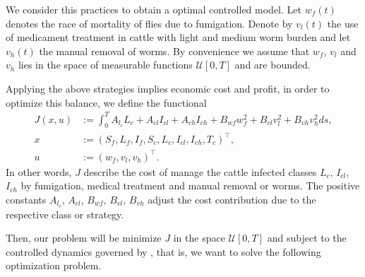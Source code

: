\documentclass[preprint, 12pt]{elsarticle}
\begin{document}
        We consider this practices to obtain a optimal controlled model.
    Let $w_f(t)$ denotes the race of mortality of flies due to fumigation.
    Denote by $v_l(t)$ the use of medicament treatment in cattle with light and
    medium worm burden and let $v_h(t)$ the manual removal of worms. By
    convenience we  assume that $w_f$, $v_l$ and $v_h$ lies in the space of
    measurable functions $\mathcal{U}[0, T]$ and are bounded.

        Applying the above strategies implies economic cost and profit, in
    order to optimize this balance, we define the functional
    \begin{equation}\label{eqn:cost_functional}
        \begin{aligned}
            J(x, u) &:=
                \int_0 ^T
                    A_{l_c} L_c
                    + A_{cl} I_{cl}
                    + A_{ch} I_{ch}
                    + B_{wf}  w_f ^ 2
                    + B_{vl}  v_l ^ 2
                    + B_{vh}  v_h ^ 2
                ds,
            \\
            x &:= (S_f, L_f, I_f, S_c, L_c, I_{cl}, I_{ch}, T_c)^{\top},
            \\
            u &:= (w_f, v_l, v_h)^{\top} .
        \end{aligned}
    \end{equation}
%
    In other words, $J$ describe the cost of manage the cattle infected
    classes $L_c$, $I_{cl}$, $I_{ch}$ by fumigation, medical treatment and
    manual removal or worms. The positive constants
    $A_{l_c}$, $A_{cl}$, $B_{wf}$, $B_{vl}$, $B_{vh}$ adjust the cost
    contribution due to the respective class or strategy.

        Then, our problem will be minimize $J$ in the space $\mathcal{U}[0,T]$
    and subject to the controlled dynamics governed by
    , that is, we
    want to solve the following optimization problem.
\end{document}
